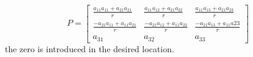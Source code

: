 \documentclass{article}
\begin{document}
\begin{equation}
P = 
\begin{bmatrix}
\frac{a_{11}a_{11} + a_{21}a_{21}}{r} & \frac{a_{11}a_{12} + a_{21}a_{22}}{r} & \frac{a_{11}a_{13} + a_{21}a_{23}}{r}\\
\frac{-a_{21}a_{11}+ a_{11}a_{21}}{r} & \frac{-a_{21}a_{12} + a_{11}a_{22}}{r} & \frac{-a_{21}a_{13} + a_{11}a{23}}{r} \\
a_{31} & a_{32} & a_{33}
\end{bmatrix}
\end{equation}
the zero is introduced in the desired location.



\end{document}
